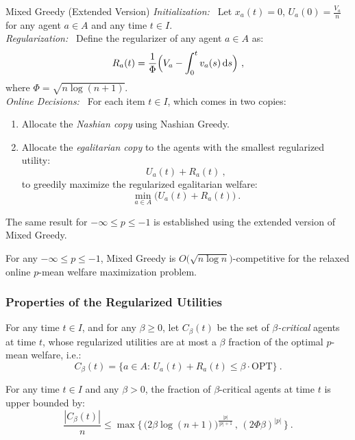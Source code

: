 \documentclass[11pt,letterpaper]{article}
\newcommand{\OPT}{\mathrm{OPT}}
\newcommand{\dif}[1]{\,\text{\rm d} #1}
\newcommand{\utility}{U}
\newcommand{\regularizer}{R}
\begin{document}
\begin{algorithm}{Mixed Greedy (Extended Version)}
	\emph{Initialization:~}
	Let $x_a(t) = 0$, $\utility_a(0) = \frac{V_a}{n}$ for any agent $a \in A$ and any time $t \in I$.\\[2ex]
	\emph{Regularization:~}
	Define the regularizer of any agent $a \in A$ as:
	\[
	\regularizer_a(t) = \frac{1}{\Phi} 
	\Big(V_a - \int_0^t v_a(s) \dif{s} \Big)
	~,
	\]
	where $\Phi = \sqrt{n \log(n+1)}$.\\[2ex]
	\emph{Online Decisions:~}
	For each item $t \in I$, which comes in two copies:
	\begin{enumerate}
		\item Allocate the \emph{Nashian copy} using Nashian Greedy.
		\item Allocate the \emph{egalitarian copy} to the agents with the smallest regularized utility:
		\[
		\utility_a(t) + \regularizer_a(t)
		~,
		\]
		to greedily maximize the regularized egalitarian welfare:
		\[
		\min_{a \in A} \big( \utility_a(t) + \regularizer_a(t) \big)
		~.
		\]
	\end{enumerate}
\end{algorithm}

The same result for $-\infty \le p\le -1$ is established using the extended version of Mixed Greedy.


\begin{theorem}
	\label{thm:harmonic-to-egalitarian-app}
	For any $-\infty \le p \le -1$, Mixed Greedy is $O \big( \sqrt{n \log n} \big)$-competitive for the relaxed online $p$-mean welfare maximization problem.
\end{theorem}


\subsubsection{Properties of the Regularized Utilities}


\begin{definition}
	For any time $t \in I$, and for any $\beta  \geq 0$, let $C_\beta(t)$ be the set of \emph{$\beta$-critical} agents at time $t$, whose regularized utilities are at most a $\beta$ fraction of the optimal $p$-mean welfare, i.e.:
	\[
	C_{\beta}(t) = \Big\{a\in A:\,\utility_a(t)+\regularizer_a(t) \leq \beta \cdot \OPT \Big\}
	~.
	\]
\end{definition}

\begin{lemma}
	\label{lem:critical-agent-number-app}
	For any time $t\in I$ and any $\beta > 0$, the fraction of $\beta$-critical agents at time $t$ is upper bounded by:
	\[
	\frac{|C_\beta(t)|}{n} \le \max \Big\{ \, \big(2 \beta \log(n+1) \big)^{\frac{|p|}{|p|+1}} \,,\, (2\Phi\beta)^{|p|} \,\Big\}
	~.
	\]
\end{lemma}
\end{document}
